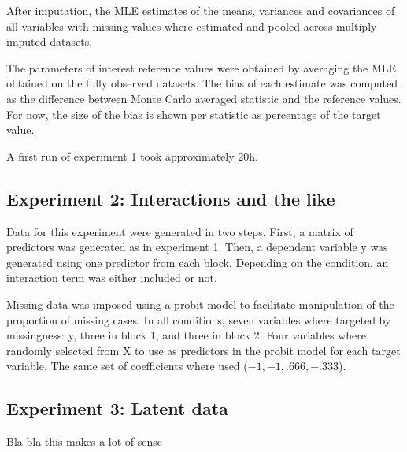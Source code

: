 After imputation, the MLE estimates of the means, variances and covariances of all variables with missing values
where estimated and pooled across multiply imputed datasets.

The parameters of interest reference values were obtained by averaging the MLE obtained on the fully observed
datasets. The bias of each estimate was computed as the difference between Monte Carlo averaged statistic and 
the reference values. For now, the size of the bias is shown per statistic as percentage of the target value.

A first run of experiment 1 took approximately 20h.

\subsection{Experiment 2: Interactions and the like}
Data for this experiment were generated in two steps. First, a matrix of predictors was generated as in experiment 1.
Then, a dependent variable y was generated using one predictor from each block. Depending on the condition, an 
interaction term was either included or not.

Missing data was imposed using a probit model to facilitate manipulation of the proportion of missing cases.
In all conditions, seven variables where targeted by missingness: y, three in block 1, and three in block 2. Four variables
where randomly selected from X to use as predictors in the probit model for each target variable. The same set of
coefficients where used ($-1, -1, .666, -.333$).

\subsection{Experiment 3: Latent data}
Bla bla this makes a lot of sense
